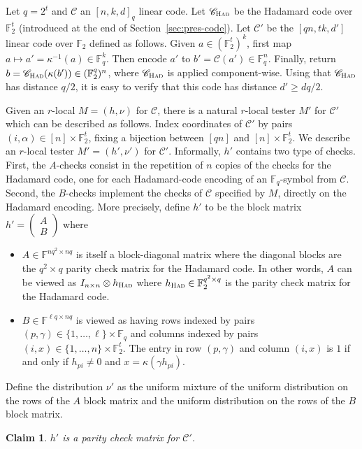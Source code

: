 \documentclass[11pt]{article}
\newtheorem{claim}[theorem]{Claim}
\theoremstyle{definition}
\newcommand{\code}{\mathscr{C}}
\newcommand{\F}{\ensuremath{\mathbb{F}}}
\newcommand{\Had}{\ensuremath{\textsc{Had}}}
\newcommand{\had}{\textsc{Had}}
\begin{document}
Let $q=2^t$ and $\code$ an $[n,k,d]_q$ linear code. Let $\code_{\Had}$ be the Hadamard code over $\F_2^t$ (introduced at the end of Section~\ref{sec:pres-code}). 
Let $\code'$ be the $[qn,tk,d']$ linear code over $\F_2$ defined as follows. Given $a\in (\F_2^t)^{k}$, first map $a\mapsto a'=\kappa^{-1}(a) \in \F_q^{k}$. Then encode $a'$ to $b'=\code(a')\in \F_q^n$. Finally, return $b=\code_\Had(\kappa(b'))\in(\F_2^q)^n$, where $\code_\Had$ is applied component-wise. Using that $\code_\Had$ has distance $q/2$, it is easy to verify that this code has distance $d'\geq dq/2$.

Given an $r$-local $M=(h,\nu)$ for $\code$, there is a natural $r$-local tester $M'$ for $\code'$ which can be described as follows. Index coordinates of $\code'$ by pairs $(i,\alpha)\in [n]\times\F_2^t$, fixing a bijection between $[qn]$ and $[n]\times \F_2^t$.  We describe an $r$-local tester $M' = (h',\nu')$ for $\code'$. Informally, $h'$ contains two type of checks. First, the $A$-checks consist in the repetition of $n$ copies of the checks for the Hadamard code, one for each Hadamard-code encoding of an $\F_q$-symbol from $\code$. Second, the $B$-checks implement the checks of $\code$ specified by $M$, directly on the Hadamard encoding. More precisely, define $h'$ to be the block matrix $h'=\begin{pmatrix} A \\ B \end{pmatrix}$ where 
\begin{itemize}
	\item $A \in \F^{nq^2 \times nq}$ is itself a block-diagonal matrix where the diagonal blocks are the $q^2 \times q$ parity check matrix for the Hadamard code. 
	In other words, $A$ can be viewed as $I_{n\times n} \otimes h_\had$ where $h_\had \in \F_2^{q^2 \times q}$ is the parity check matrix for the Hadamard code. 
	\item $B \in \F^{\ell q \times nq}$ is viewed as having rows indexed by pairs $(p,\gamma) \in \{1,\ldots,\ell\} \times \F_q$ and columns indexed by pairs $(i,x) \in \{1,\ldots,n\} \times \F_2^t$. The entry in row $(p,\gamma)$ and column $(i,x)$ is $1$ if and only if $h_{pi} \neq 0$ and $x = \kappa(\gamma h_{pi})$.
\end{itemize}
Define the distribution $\nu'$ as the uniform mixture of the uniform distribution on the rows of the $A$ block matrix and the uniform distribution on the rows of the $B$ block matrix. 

\begin{claim}
$h'$ is a parity check matrix for $\code'$.
\end{claim}
\end{document}
